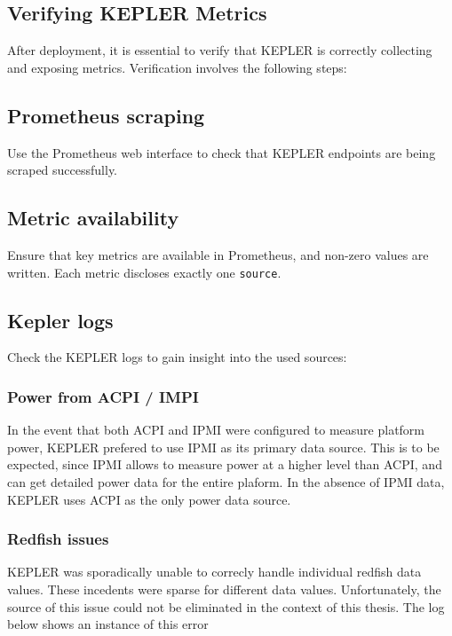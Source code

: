 \subsection{Verifying KEPLER Metrics}

After deployment, it is essential to verify that KEPLER is correctly collecting and exposing metrics. Verification involves the following steps:

\subsection{Prometheus scraping}

Use the Prometheus web interface to check that KEPLER endpoints are being scraped successfully.

\subsection{Metric availability}

Ensure that key metrics are available in Prometheus, and non-zero values are written. Each metric discloses exactly one \texttt{source}.

\subsection{Kepler logs} 

Check the KEPLER logs to gain insight into the used sources:



\subsubsection{Power from ACPI / IMPI}

In the event that both ACPI and IPMI were configured to measure platform power, KEPLER prefered to use IPMI as its primary data source. This is to be expected, since IPMI allows to measure power at a higher level than ACPI, and can get detailed power data for the entire plaform. In the absence of IPMI data, KEPLER uses ACPI as the only power data source. 

\subsubsection{Redfish issues}

KEPLER was sporadically unable to correcly handle individual redfish data values. These incedents were sparse for different data values. Unfortunately, the source of this issue could not be eliminated in the context of this thesis. The log below shows an instance of this error

